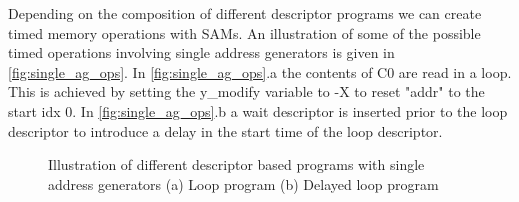 Depending on the composition of different descriptor programs we can create
timed memory operations with SAMs. An illustration of some of the possible timed
operations involving single address generators is given in
\autoref{fig:single_ag_ops}. In \autoref{fig:single_ag_ops}.a the contents of C0
are read in a loop. This is achieved by setting the y\_modify variable to -X to
reset "addr" to the start idx 0. In \autoref{fig:single_ag_ops}.b a wait
descriptor is inserted prior to the loop descriptor to introduce a delay in the
start time of the loop descriptor.

\begin{figure}
    \centering
    \hspace{0.2cm}
    \caption{Illustration of different descriptor based programs with single address generators (a) Loop program (b) Delayed loop program}
    \label{fig:single_ag_ops}
\end{figure}

